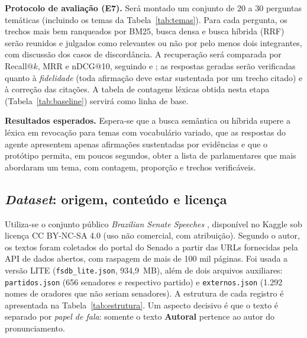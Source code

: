 \documentclass[12pt]{article}
\begin{document}
\textbf{Protocolo de avaliação (E7).} Será montado um conjunto de 20 a 30 perguntas temáticas
(incluindo os temas da Tabela~\ref{tab:temas}). Para cada pergunta, os trechos mais bem
ranqueados por BM25, busca densa e busca híbrida (RRF) serão reunidos e julgados como relevantes
ou não por pelo menos dois integrantes, com discussão dos casos de discordância. A recuperação
será comparada por Recall@$k$, MRR e nDCG@10, seguindo \cite{cunha2026} e \cite{vitorio2022}; as
respostas geradas serão verificadas quanto à \emph{fidelidade} (toda afirmação deve estar
sustentada por um trecho citado) e à correção das citações. A tabela de contagens léxicas obtida
nesta etapa (Tabela~\ref{tab:baseline}) servirá como linha de base.

\textbf{Resultados esperados.} Espera-se que a busca semântica ou híbrida supere a léxica em
revocação para temas com vocabulário variado, que as respostas do agente apresentem apenas
afirmações sustentadas por evidências e que o protótipo permita, em poucos segundos, obter a lista
de parlamentares que mais abordaram um tema, com contagem, proporção e trechos verificáveis.

\subsection{\textit{Dataset}: origem, conteúdo e licença}\label{sec:dataset}

Utiliza-se o conjunto público \textit{Brazilian Senate Speeches} \cite{licolabres2024},
disponível no Kaggle sob licença CC BY-NC-SA 4.0 (uso não comercial, com atribuição). Segundo o
autor, os textos foram coletados do portal do Senado a partir das URLs fornecidas pela API de
dados abertos, com raspagem de mais de 100 mil páginas. Foi usada a versão LITE
(\texttt{fsdb\_lite.json}, 934,9~MB), além de dois arquivos auxiliares:
\texttt{partidos.json} (656 senadores e respectivo partido) e \texttt{externos.json} (1.292
nomes de oradores que não seriam senadores). A estrutura de cada registro é apresentada na
Tabela~\ref{tab:estrutura}. Um aspecto decisivo é que o texto é separado por \emph{papel de
fala}: somente o texto \textbf{Autoral} pertence ao autor do pronunciamento.
\end{document}
